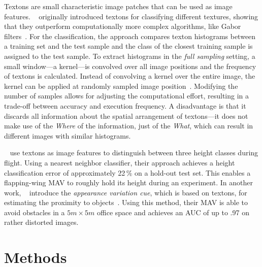 \documentclass{report}
\begin{document}
Textons are small characteristic image patches that can be used as
image
features. \citeauthor{varma2005statistical}~\cite{varma2005statistical}
originally introduced textons for classifying different textures,
showing that they outperform computationally more complex algorithms,
like Gabor filters~\cite{varma2005statistical}. For the
classification, the approach compares texton histograms between a
training set and the test sample and the class of the closest training
sample is assigned to the test sample. To extract histograms in the
\emph{full sampling} setting, a small window---a kernel---is convolved
over all image positions and the frequency of textons is calculated.
Instead of convolving a kernel over the entire image, the kernel can
be applied at randomly sampled image
position~\cite{de2012sub}. %
Modifying the number of samples allows for adjusting the computational
effort, resulting in a trade-off between accuracy and execution
frequency. A disadvantage is that it discards all information about
the spatial arrangement of textons---it does not make use of the
\emph{Where} of the information, just of the \emph{What}, which can
result in different images with similar histograms.

\citeauthor{de2009design}~\cite{de2009design} use textons as image
features to distinguish between three height classes during
flight. Using a nearest neighbor classifier, their approach achieves a
height classification error of approximately 22\,\% on a hold-out test
set.  This enables a flapping-wing MAV to roughly hold its height
during an experiment. In another work,
\citeauthor{de2012appearance}~\cite{de2012appearance} introduce the
\emph{appearance variation cue}, which is based on textons, for
estimating the proximity to objects~\cite{de2012appearance}.
Using this method, their MAV is able to avoid obstacles in a
$5m \times 5m$ office space and achieves an AUC of up to .97 on rather
distorted images.

\chapter{Methods}
\label{chap:methods}
\end{document}
